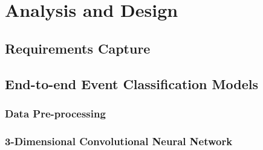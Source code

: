 \chapter{Analysis and Design} \label{chap:analysis_and_design}

\section{Requirements Capture}


\section{End-to-end Event Classification Models}

\subsection{Data Pre-processing}

\subsection{3-Dimensional Convolutional Neural Network}

